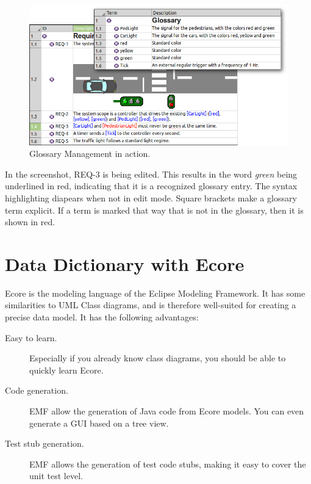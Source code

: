 \begin{figure}[h!]
  \centering
  \includegraphics[width=\linewidth]{../se-images/tutorial-step02.png}
  \caption{Glossary Management in action.}
  \label{fig:tutorial-step02}
\end{figure}

In the screenshot, REQ-3 is being edited.  This results in the word \textit{green} being underlined in red, indicating that it is a recognized glossary entry.  The syntax highlighting diapears when not in edit mode.  Square brackets make a glossary term explicit.  If a term is marked that way that is not in the glossary, then it is shown in red.

\section{Data Dictionary with Ecore}
\label{sec:tutorial-ecore}

Ecore is the modeling language of the Eclipse Modeling Framework.  It has some similarities to UML Class diagrams, and is therefore well-suited for creating a precise data model.  It has the following advantages:

\begin{description}
\item[Easy to learn.] Especially if you already know class diagrams, you should be able to quickly learn Ecore.
\item[Code generation.] EMF allow the generation of Java code from Ecore models.  You can even generate a GUI based on a tree view.
\item[Test stub generation.] EMF allows the generation of test code stubs, making it easy to cover the unit test level.
\end{description}

